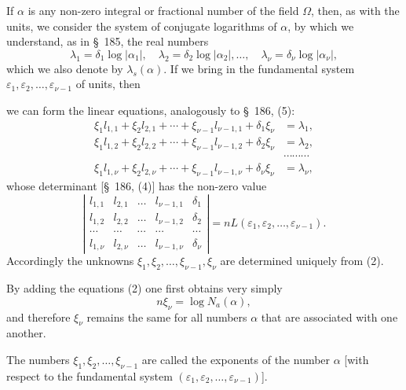 \documentclass[11pt]{article}
\newcommand{\Na}{N_a}
\begin{document}
If $\alpha$ is any non-zero integral or fractional number of the field $\Omega$, then, as with the units, we consider the system of conjugate logarithms of $\alpha$, by which we understand, as in \S~185, the real numbers
\begin{equation}
\lambda_1=\delta_1\log|\alpha_1|,\quad
\lambda_2=\delta_2\log|\alpha_2|,\ldots,\quad
\lambda_\nu=\delta_\nu\log|\alpha_\nu|,
\tag{1}
\end{equation}
which we also denote by $\lambda_s(\alpha)$. If we bring in the fundamental system $\varepsilon_1,\varepsilon_2,\ldots,\varepsilon_{\nu-1}$ of units, then

we can form the linear equations, analogously to \S~186, (5):
\begin{equation}
\begin{aligned}
\xi_1l_{1,1}+\xi_2l_{2,1}+\cdots+\xi_{\nu-1}l_{\nu-1,1}+\delta_1\xi_\nu&=\lambda_1,\\
\xi_1l_{1,2}+\xi_2l_{2,2}+\cdots+\xi_{\nu-1}l_{\nu-1,2}+\delta_2\xi_\nu&=\lambda_2,\\
&\cdots\cdots\cdots\\
\xi_1l_{1,\nu}+\xi_2l_{2,\nu}+\cdots+\xi_{\nu-1}l_{\nu-1,\nu}+\delta_\nu\xi_\nu&=\lambda_\nu,
\end{aligned}
\tag{2}
\end{equation}
whose determinant [\S~186, (4)] has the non-zero value
\begin{equation}
\left|
\begin{array}{ccccc}
l_{1,1}&l_{2,1}&\ldots&l_{\nu-1,1}&\delta_1\\
l_{1,2}&l_{2,2}&\ldots&l_{\nu-1,2}&\delta_2\\
\cdots&\cdots&\cdots&\cdots&\cdots\\
l_{1,\nu}&l_{2,\nu}&\ldots&l_{\nu-1,\nu}&\delta_\nu
\end{array}
\right|=nL(\varepsilon_1,\varepsilon_2,\ldots,\varepsilon_{\nu-1}).
\tag{3}
\end{equation}
Accordingly the unknowns $\xi_1,\xi_2,\ldots,\xi_{\nu-1},\xi_\nu$ are determined uniquely from (2).

By adding the equations (2) one first obtains very simply
\begin{equation}
n\xi_\nu=\log \Na(\alpha),
\tag{4}
\end{equation}
and therefore $\xi_\nu$ remains the same for all numbers $\alpha$ that are associated with one another.

The numbers $\xi_1,\xi_2,\ldots,\xi_{\nu-1}$ are called the exponents of the number $\alpha$ [with respect to the fundamental system $(\varepsilon_1,\varepsilon_2,\ldots,\varepsilon_{\nu-1})$].
\end{document}
